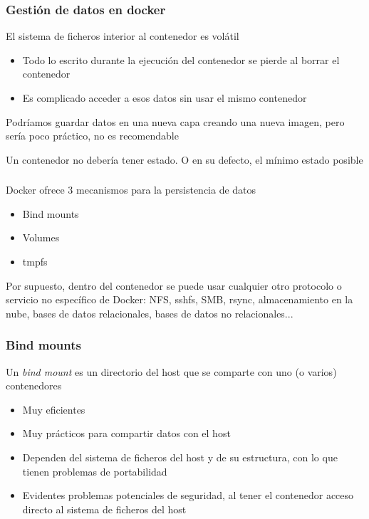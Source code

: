 \documentclass[ucs]{beamer}
\begin{document}
\begin{frame}[fragile]
\frametitle{Gestión de datos en docker}

El sistema de ficheros interior al contenedor es volátil

\begin{itemize}
\item
Todo lo escrito
durante la ejecución del contenedor se pierde al borrar el contenedor
\item
Es complicado acceder a esos datos sin usar el mismo contenedor

\end{itemize}
Podríamos guardar datos en una nueva capa creando una nueva imagen,
pero sería poco práctico, no es recomendable

\end{frame}



\begin{frame}[fragile]

Un contenedor no debería tener estado. O en su defecto, el mínimo
estado posible

\frametitle{}
Docker ofrece 3 mecanismos para la persistencia de datos
\begin{itemize}
\item
Bind mounts
\item
Volumes
\item
tmpfs
\end{itemize}

Por supuesto, dentro del contenedor se puede usar cualquier
otro protocolo o servicio no específico de Docker:
NFS, sshfs, SMB, rsync, almacenamiento en la nube,
bases de datos relacionales, 
bases de datos no relacionales...
\end{frame}



\begin{frame}[fragile]
\frametitle{Bind mounts}
Un \emph{bind mount} es un directorio del host que se comparte con uno (o varios) contenedores

\begin{itemize}
\item
Muy eficientes

\item
Muy prácticos para compartir datos con el host

\item
Dependen del sistema de ficheros del host y de su estructura,
con lo que tienen problemas de portabilidad

\item
Evidentes problemas potenciales de seguridad, al tener el contenedor
acceso directo al sistema de ficheros del host
\end{itemize}

\end{frame}
\end{document}
